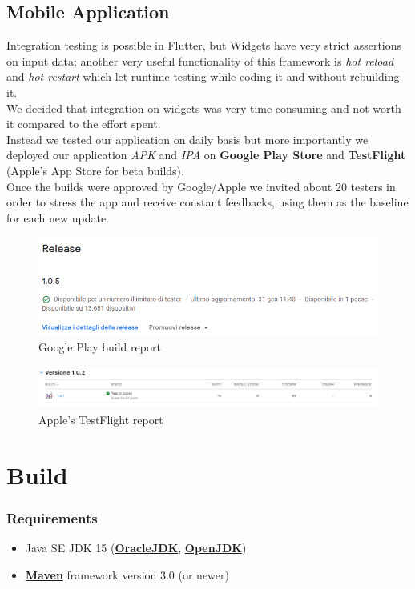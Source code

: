 \documentclass[table, 12pt]{article}
\begin{document}
\subsection{Mobile Application}
Integration testing is possible in Flutter, but Widgets have very strict assertions on input data; another very useful functionality of this framework is \textit{hot reload} and \textit{hot restart} which let runtime testing while coding it and without rebuilding it.\\
We decided that integration on widgets was very time consuming and not worth it compared to the effort spent.\\
Instead we tested our application on daily basis but more importantly we deployed our application \textit{APK} and \textit{IPA} on \textbf{Google Play Store} and \textbf{TestFlight} (Apple's App Store for beta builds).\\
Once the builds were approved by Google/Apple we invited about 20 testers in order to stress the app and receive constant feedbacks, using them as the baseline for each new update. 
\begin{figure}[H]
    \includegraphics[width=\textwidth]{assets/console.png}
    \caption{Google Play build report}
\end{figure}
\begin{figure}[H]
    \includegraphics[width=\textwidth]{assets/testflight.png}
    \caption{Apple's TestFlight report}
\end{figure}

\section{Build}

\subsubsection{Requirements}
\begin{itemize}
    \item Java SE JDK 15 (\textbf{\href{https://jdk.java.net/15/}{OracleJDK}}, \textbf{\href{https://openjdk.java.net/projects/jdk/15/}{OpenJDK}})
    \item \textbf{\href{https://maven.apache.org/}{Maven}} framework version 3.0 (or newer)
\end{itemize}
\end{document}

